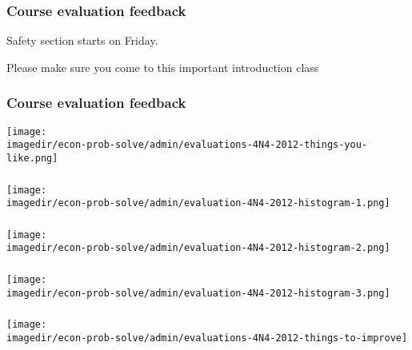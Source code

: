 \begin{frame}\frametitle{Course evaluation feedback}
	Safety section starts on Friday.
	
	
	\vspace{12pt}
	Please make sure you come to this important introduction class
\end{frame}


\begin{frame}\frametitle{Course evaluation feedback}
	\begin{center}
		\texttt{[image: \\imagedir/econ-prob-solve/admin/evaluations-4N4-2012-things-you-like.png]}
	\end{center}
\end{frame}

\begin{frame}\frametitle{}
	\begin{center}
		\texttt{[image: \\imagedir/econ-prob-solve/admin/evaluation-4N4-2012-histogram-1.png]}
	\end{center}
\end{frame}

\begin{frame}\frametitle{}
	\begin{center}
		\texttt{[image: \\imagedir/econ-prob-solve/admin/evaluation-4N4-2012-histogram-2.png]}
	\end{center}
\end{frame}

\begin{frame}\frametitle{}
	\begin{center}
		\texttt{[image: \\imagedir/econ-prob-solve/admin/evaluation-4N4-2012-histogram-3.png]}
	\end{center}
\end{frame}

\begin{frame}\frametitle{}
	\begin{center}
		\texttt{[image: \\imagedir/econ-prob-solve/admin/evaluations-4N4-2012-things-to-improve]}
	\end{center}
\end{frame}


